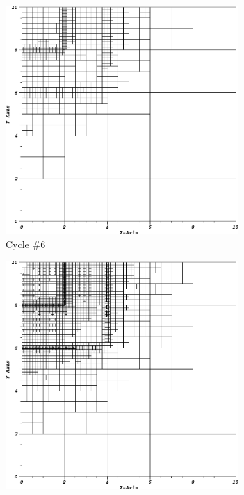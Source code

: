 \begin{figure}
\centering
	\begin{subfigure}[b]{0.485\textwidth}
		\centering
		\includegraphics[width=0.975\textwidth]{figures/sec_DSA/IW_PWLD1_PGLC24_cyc06.png}
		\caption{Cycle \#6}
	\end{subfigure}
	\hfill
	\begin{subfigure}[b]{0.485\textwidth}
		\centering
		\includegraphics[width=0.975\textwidth]{figures/sec_DSA/IW_PWLD1_PGLC24_cyc12.png}

\end{subfigure}
\end{figure}

